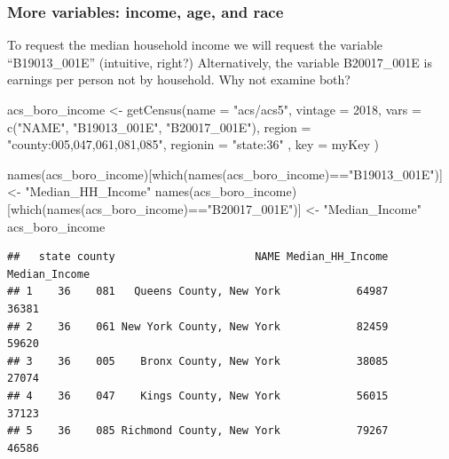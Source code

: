 \documentclass[
  openany]{book}
\newenvironment{Shaded}{\begin{snugshade}}{\end{snugshade}}
\newcommand{\AttributeTok}[1]{\textcolor[rgb]{0.77,0.63,0.00}{#1}}
\newcommand{\DecValTok}[1]{\textcolor[rgb]{0.00,0.00,0.81}{#1}}
\newcommand{\FunctionTok}[1]{\textcolor[rgb]{0.00,0.00,0.00}{#1}}
\newcommand{\NormalTok}[1]{#1}
\newcommand{\OtherTok}[1]{\textcolor[rgb]{0.56,0.35,0.01}{#1}}
\newcommand{\SpecialCharTok}[1]{\textcolor[rgb]{0.00,0.00,0.00}{#1}}
\newcommand{\StringTok}[1]{\textcolor[rgb]{0.31,0.60,0.02}{#1}}
\begin{document}
\hypertarget{more-variables-income-age-and-race}{%
\subsubsection*{More variables: income, age, and race}\label{more-variables-income-age-and-race}}

To request the median household income we will request the variable ``B19013\_001E'' (intuitive, right?) Alternatively, the variable B20017\_001E is earnings per person not by household. Why not examine both?

\begin{Shaded}
\begin{Highlighting}[]
\NormalTok{acs\_boro\_income }\OtherTok{\textless{}{-}} \FunctionTok{getCensus}\NormalTok{(}\AttributeTok{name =} \StringTok{"acs/acs5"}\NormalTok{,}
                         \AttributeTok{vintage =} \DecValTok{2018}\NormalTok{,}
                         \AttributeTok{vars =} \FunctionTok{c}\NormalTok{(}\StringTok{"NAME"}\NormalTok{, }\StringTok{"B19013\_001E"}\NormalTok{, }\StringTok{"B20017\_001E"}\NormalTok{),}
                         \AttributeTok{region =} \StringTok{"county:005,047,061,081,085"}\NormalTok{,}
                         \AttributeTok{regionin =} \StringTok{"state:36"}\NormalTok{ , }\AttributeTok{key =}\NormalTok{ myKey}
\NormalTok{                         )}

\FunctionTok{names}\NormalTok{(acs\_boro\_income)[}\FunctionTok{which}\NormalTok{(}\FunctionTok{names}\NormalTok{(acs\_boro\_income)}\SpecialCharTok{==}\StringTok{"B19013\_001E"}\NormalTok{)] }\OtherTok{\textless{}{-}} \StringTok{"Median\_HH\_Income"}
\FunctionTok{names}\NormalTok{(acs\_boro\_income)[}\FunctionTok{which}\NormalTok{(}\FunctionTok{names}\NormalTok{(acs\_boro\_income)}\SpecialCharTok{==}\StringTok{"B20017\_001E"}\NormalTok{)] }\OtherTok{\textless{}{-}} \StringTok{"Median\_Income"}
\NormalTok{acs\_boro\_income}
\end{Highlighting}
\end{Shaded}

\begin{verbatim}
##   state county                      NAME Median_HH_Income Median_Income
## 1    36    081   Queens County, New York            64987         36381
## 2    36    061 New York County, New York            82459         59620
## 3    36    005    Bronx County, New York            38085         27074
## 4    36    047    Kings County, New York            56015         37123
## 5    36    085 Richmond County, New York            79267         46586
\end{verbatim}
\end{document}
